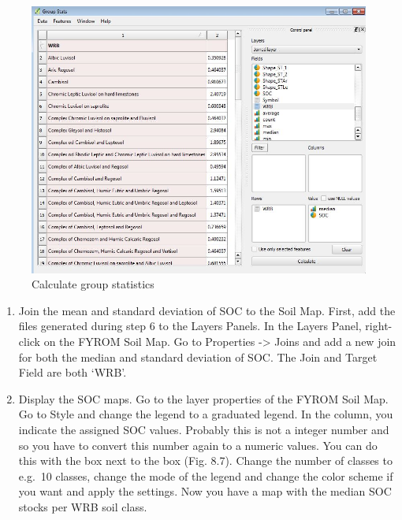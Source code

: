 \documentclass[10pt,b5paper,]{book}
\providecommand{\tightlist}{%
  \setlength{\itemsep}{0pt}\setlength{\parskip}{0pt}}
\theoremstyle{definition}
\theoremstyle{definition}
\theoremstyle{definition}
\theoremstyle{remark}
\begin{document}
\begin{figure}

{\centering \includegraphics[width=0.8\linewidth]{images/Conv_upscaling6} 

}

\caption{Calculate group statistics}\label{fig:unnamed-chunk-32}
\end{figure}

\begin{enumerate}
\def\labelenumi{\arabic{enumi}.}
\setcounter{enumi}{6}
\tightlist
\item
  Join the mean and standard deviation of SOC to the Soil Map. First,
  add the files generated during step 6 to the Layers Panels. In the
  Layers Panel, right-click on the FYROM Soil Map. Go to Properties
  -\textgreater{} Joins and add a new join for both the median and
  standard deviation of SOC. The Join and Target Field are both `WRB'.
\item
  Display the SOC maps. Go to the layer properties of the FYROM Soil
  Map. Go to Style and change the legend to a graduated legend. In the
  column, you indicate the assigned SOC values. Probably this is not a
  integer number and so you have to convert this number again to a
  numeric values. You can do this with the box next to the box (Fig.
  8.7). Change the number of classes to e.g.~10 classes, change the mode
  of the legend and change the color scheme if you want and apply the
  settings. Now you have a map with the median SOC stocks per WRB soil
  class.
\end{enumerate}
\end{document}
